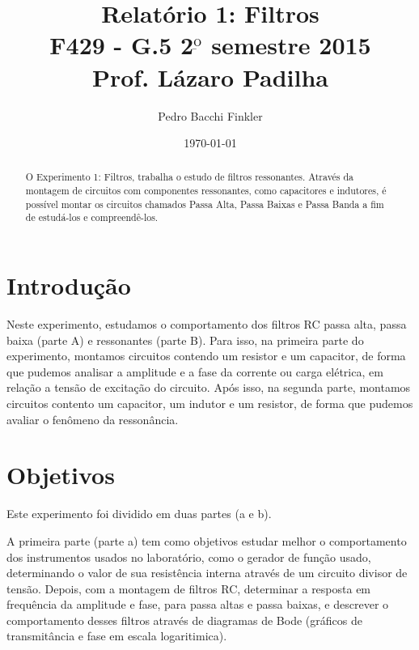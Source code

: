 \documentclass[11pt,a4paper]{article}
\begin{document}
\title{Relatório 1: Filtros \\
\small{
F429 - G.5  2$^{ \underbar{\text{o}} }$ semestre 2015\\
Prof. Lázaro Padilha }
}
\author{Pedro Bacchi Finkler}

\date{\today}

\maketitle %
\begin{abstract}

O Experimento 1: Filtros, trabalha o estudo de filtros ressonantes. Através da montagem de circuitos com componentes ressonantes, como capacitores e indutores, é possível montar os circuitos chamados Passa Alta, Passa Baixas e Passa Banda a fim de estudá-los e compreendê-los.
\end{abstract}

\newpage %
\tableofcontents %
\section{Introdução}
Neste experimento, estudamos o comportamento dos filtros RC passa alta, passa baixa (parte A) e ressonantes (parte B). Para isso, na primeira parte do experimento, montamos circuitos contendo um resistor e um capacitor, de forma que pudemos analisar a amplitude e a fase da corrente ou carga elétrica, em relação a tensão de excitação do circuito. Após isso, na segunda parte, montamos  circuitos contento um capacitor, um indutor e um resistor, de forma que pudemos avaliar o fenômeno da ressonância.

\section{Objetivos}
Este experimento foi dividido em duas partes (a e b). 

A primeira parte (parte a) tem como objetivos estudar melhor o comportamento dos instrumentos usados no laboratório, como o gerador de função usado, determinando o valor de sua resistência interna através de um circuito divisor de tensão. Depois, com a montagem de filtros RC, determinar a resposta em frequência da amplitude e fase, para passa altas e passa baixas, e descrever o comportamento desses filtros através de diagramas de Bode (gráficos de transmitância e fase em escala logaritimica).
\end{document}
